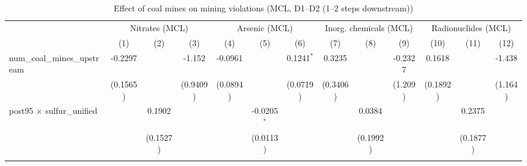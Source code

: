 
\begin{table}[htbp]
   
   \caption{\label{2sls_4step_d1_d2_minevio_mcl} Effect of coal mines on mining violations (MCL, D1--D2 (1--2 steps downstream))}
   \bigskip
   
   \centering
   
   \begin{adjustbox}{width = \textwidth, center}
      
      
      \begin{tabular}{lcccccccccccc}
         \toprule
         
          & \multicolumn{3}{c}{Nitrates (MCL)} & \multicolumn{3}{c}{Arsenic (MCL)} & \multicolumn{3}{c}{Inorg. chemicals (MCL)} & \multicolumn{3}{c}{Radionuclides (MCL)}\\
         
                                                           & (1)           & (2)           & (3)           & (4)           & (5)           & (6)           & (7)           & (8)                  & (9)                  & (10)          & (11)          & (12)\\  
         
         \midrule 
         num\_coal\_mines\_upstream                        & -0.2297       &               & -1.152        & -0.0961       &               & 0.1241$^{*}$  & 0.3235        &                      & -0.2327              & 0.1618        &               & -1.438\\   
                                                           & (0.1565)      &               & (0.9409)      & (0.0894)      &               & (0.0719)      & (0.3406)      &                      & (1.209)              & (0.1892)      &               & (1.164)\\   
         post95 $\times$ sulfur\_unified                   &               & 0.1902        &               &               & -0.0205$^{*}$ &               &               & 0.0384               &                      &               & 0.2375        &   \\   
                                                           &               & (0.1527)      &               &               & (0.0113)      &               &               & (0.1992)             &                      &               & (0.1877)      &   \\   
         
          \\
         

\end{tabular}
\end{adjustbox}
\end{table}

